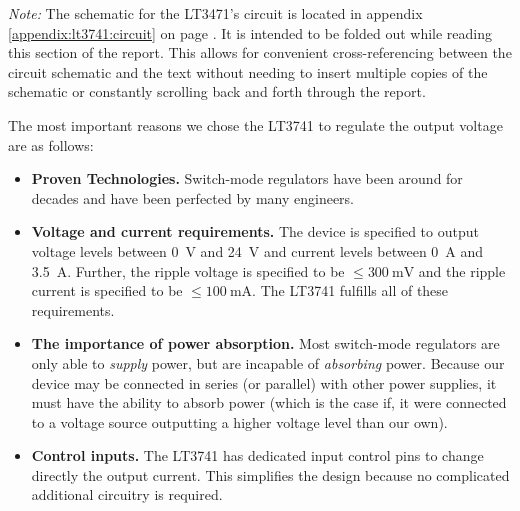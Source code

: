 \emph{Note:} The schematic  for the  LT3471's circuit  is located  in appendix
\ref{appendix:lt3741:circuit} on page \pageref{appendix:lt3741:circuit}. It is
intended  to be  folded out  while reading  this section  of the  report. This
allows for convenient cross-referencing between  the circuit schematic and the
text without needing to insert multiple  copies of the schematic or constantly
scrolling back and forth through the report.

The most important reasons we chose  the LT3741 to regulate the output voltage
are as follows:

\begin{itemize}
    \item \textbf{Proven Technologies.}
        Switch-mode  regulators have  been around  for decades  and have  been
        perfected by many engineers.
    \item \textbf{Voltage and current requirements.}
        The device is specified to output voltage levels between \SI{0}{\volt}
        and  \SI{24}{\volt} and  current  levels  between \SI{0}{\ampere}  and
        \SI{3.5}{\ampere}.   Further, the  ripple voltage  is specified  to be
        $\le\SI{300}{\milli\volt}$  and the  ripple  current  is specified  to
        be  $\le\SI{100}{\milli\ampere}$. The  LT3741  fulfills all  of  these
        requirements.
    \item \textbf{The importance of power absorption.}
        Most switch-mode regulators are only  able to \emph{supply} power, but
        are  incapable of  \emph{absorbing} power. Because  our device  may be
        connected in series  (or parallel) with other power  supplies, it must
        have  the ability  to absorb  power  (which is  the case  if, it  were
        connected to a  voltage source outputting a higher  voltage level than
        our own).
    \item \textbf{Control inputs.}
        The LT3741  has dedicated  input control pins  to change  directly the
        output  current. This simplifies  the  design  because no  complicated
        additional circuitry is required.
\end{itemize}


